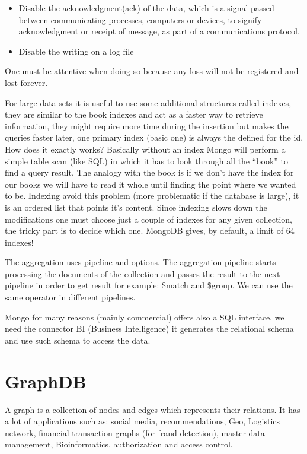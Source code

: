 \documentclass[a4page, 11pt]{article}
\begin{document}
\begin{itemize}[noitemsep]
	 
	\item
	Disable the acknowledgment(ack) of the data, which is a signal passed between communicating processes, computers or devices, to signify acknowledgment or receipt of message, as part of a communications
	protocol.
	\item
	Disable the writing on a log file
\end{itemize}

One must be attentive when doing so because any loss will not be registered and lost forever.

For large data-sets it is useful to use some additional structures called indexes, they are similar to the book indexes and act as a faster way to retrieve information, they might require more time during the insertion but makes the queries faster later, one primary index (basic one) is always the defined for the id. How does it exactly works?
Basically without an index Mongo will perform a simple table scan (like SQL) in which it has to look through all the ``book'' to find a query result, The analogy with the book is if we don't have the index for our books we will have to read it whole until finding the point where we wanted to be. 
Indexing avoid this problem (more problematic if the database is large), it is an ordered list that points it's content.
Since indexing slows down the modifications one must choose just a couple of indexes for any given collection, the tricky part is to decide which one. MongoDB gives, by default, a limit of 64 indexes!

The aggregation uses pipeline and options. 
The aggregation pipeline starts processing the documents of the collection and passes the result to the next pipeline in order to get result for example: \$match and \$group. 
We can use the same operator in different pipelines.

Mongo for many reasons (mainly commercial) offers also a SQL interface, we need the connector BI (Business Intelligence) it generates the relational schema and use such schema to access the data.

\section{GraphDB\cite{Neo4J}}

A graph is a collection of nodes and edges which represents their relations. 
It has a lot of applications such as: social media, recommendations, Geo, Logistics network, financial transaction graphs (for fraud detection), master data management, Bioinformatics, authorization and access control.
\end{document}
